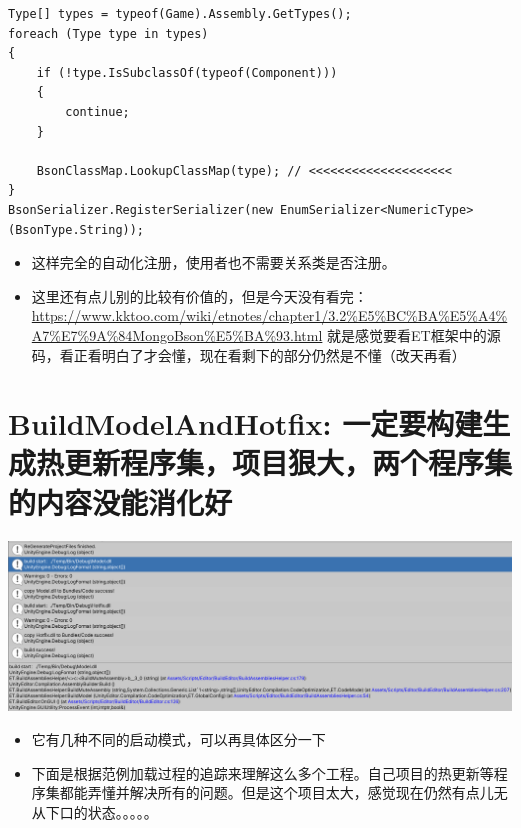 \documentclass[9pt, b5paper]{article}
\begin{document}
\begin{verbatim}
Type[] types = typeof(Game).Assembly.GetTypes();
foreach (Type type in types)
{
    if (!type.IsSubclassOf(typeof(Component)))
    {
        continue;
    }

    BsonClassMap.LookupClassMap(type); // <<<<<<<<<<<<<<<<<<<< 
}
BsonSerializer.RegisterSerializer(new EnumSerializer<NumericType>(BsonType.String));
\end{verbatim}
\begin{itemize}
\item 这样完全的自动化注册，使用者也不需要关系类是否注册。
\item 这里还有点儿别的比较有价值的，但是今天没有看完：\url{https://www.kktoo.com/wiki/etnotes/chapter1/3.2\%E5\%BC\%BA\%E5\%A4\%A7\%E7\%9A\%84MongoBson\%E5\%BA\%93.html}  就是感觉要看ET框架中的源码，看正看明白了才会懂，现在看剩下的部分仍然是不懂（改天再看）
\end{itemize}
\section{BuildModelAndHotfix: 一定要构建生成热更新程序集，项目狠大，两个程序集的内容没能消化好}
\label{sec-6}

\includegraphics[width=.9\linewidth]{./pic/readme_20230125_103303.png}
\begin{itemize}
\item 它有几种不同的启动模式，可以再具体区分一下
\item 下面是根据范例加载过程的追踪来理解这么多个工程。自己项目的热更新等程序集都能弄懂并解决所有的问题。但是这个项目太大，感觉现在仍然有点儿无从下口的状态。。。。。
\end{itemize}
\end{document}
